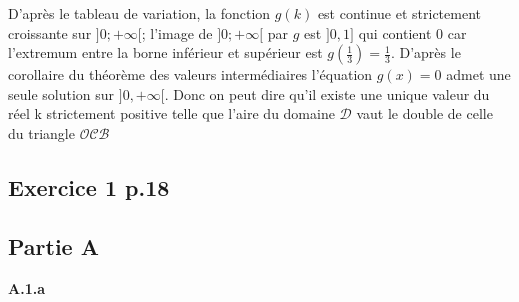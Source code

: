\documentclass{article}
\begin{document}
\vspace{2mm}

\noindent D'après le tableau de variation, la fonction $g(k)$ est continue et strictement croissante sur $]0; +\infty[$; l'image de $]0; +\infty[$ par $g$ est $]0, 1]$ qui contient 0 car l'extremum entre la borne inférieur et supérieur est $g(\frac{1}{3}) = \displaystyle\frac{1}{3}$. D'après le corollaire du théorème des valeurs intermédiaires l'équation $g(x) = 0$ admet une seule solution sur $]0, +\infty[$. Donc on peut dire qu'il existe une unique valeur du réel k strictement positive telle que l'aire du domaine $\mathcal{D}$ vaut le double de celle du triangle $\mathcal{OCB}$

\vspace{4mm}
\begin{center}
\section{Exercice 1 p.18}
\end{center}

\subsection*{Partie A}

\textbf{A.1.a}
\end{document}

